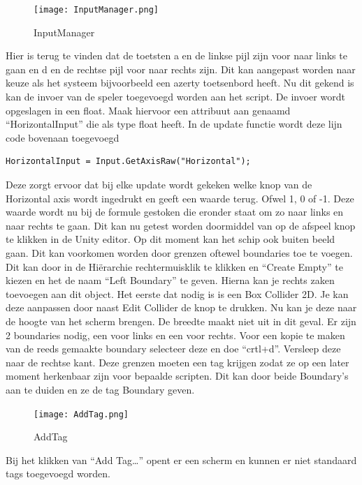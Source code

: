 \begin{figure}[H]
    \centering
    \texttt{[image: InputManager.png]}
    \caption{InputManager}
    \label{fig:InputManager}
\end{figure}

Hier is terug te vinden dat de toetsten a en de linkse pijl zijn voor naar links te gaan en d en de rechtse pijl voor naar rechts zijn. Dit kan aangepast worden naar keuze als het systeem bijvoorbeeld een azerty toetsenbord heeft.
Nu dit gekend is kan de invoer van de speler toegevoegd worden aan het script. De invoer wordt opgeslagen in een float. Maak hiervoor een attribuut aan genaamd “HorizontalInput” die als type float heeft. In de update functie wordt deze lijn code bovenaan toegevoegd

\begin{lstlisting}[style=csharp]
    HorizontalInput = Input.GetAxisRaw("Horizontal");
\end{lstlisting}

Deze zorgt ervoor dat bij elke update wordt gekeken welke knop van de Horizontal axis wordt ingedrukt en geeft een waarde terug. Ofwel 1, 0 of -1. Deze waarde wordt nu bij de formule gestoken die eronder staat om zo naar links en naar rechts te gaan. Dit kan nu getest worden doormiddel van op de afspeel knop te klikken in de Unity editor.
Op dit moment kan het schip ook buiten beeld gaan. Dit kan voorkomen worden door grenzen oftewel boundaries toe te voegen. Dit kan door in de Hiërarchie rechtermuisklik te klikken en “Create Empty” te kiezen en het de naam “Left Boundary” te geven. Hierna kan je rechts zaken toevoegen aan dit object. Het eerste dat nodig is is een Box Collider 2D. Je kan deze aanpassen door naast Edit Collider de knop te drukken. Nu kan je deze naar de hoogte van het scherm brengen. De breedte maakt niet uit in dit geval. Er zijn 2 boundaries nodig, een voor links en een voor rechts. Voor een kopie te maken van de reeds gemaakte boundary selecteer deze en doe “crtl+d”. Versleep deze naar de rechtse kant. Deze grenzen moeten een tag krijgen zodat ze op een later moment herkenbaar zijn voor bepaalde scripten. Dit kan door beide Boundary’s aan te duiden en ze de tag Boundary geven. 

\begin{figure}[H]
    \centering
    \texttt{[image: AddTag.png]}
    \caption{AddTag}
    \label{fig:AddTag}
\end{figure}

Bij het klikken van “Add Tag…” opent er een scherm en kunnen er niet standaard tags toegevoegd worden.


